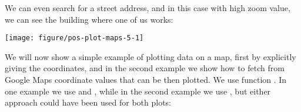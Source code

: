 \documentclass[paper=a4,10pt,div=17,headsepline,BCOR=12mm,twoside,open=right]{scrbook}\usepackage{knitr}
\begin{document}
We can even search for a street address, and in this case with high zoom value, we can see the building where one of us works:

\begin{knitrout}\footnotesize
{}\color{fgcolor}\begin{kframe}
\begin{alltt}
 \hlkwb{<-} \hlstd{(}\hlstd{,}
                \hlstd{=}\hlstd{,}
                \hlstd{=}\hlstd{)}
\end{alltt}
\end{kframe}

{\centering \texttt{[image: figure/pos-plot-maps-5-1]} 

}



\end{knitrout}

We will now show a simple example of plotting data on a map, first by explicitly giving the coordinates, and in the second example we show how to fetch from Google Maps coordinate values that can be then plotted. We use function . In one example we use  and , while in the second example we use , but either approach could have been used for both plots:
\end{document}
